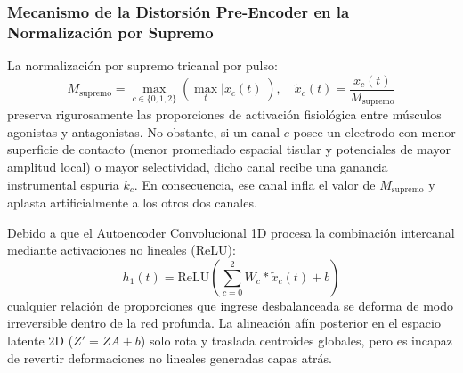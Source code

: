 \documentclass[11pt,a4paper,openany]{book}
\theoremstyle{definition}
\begin{document}
\subsubsection{Mecanismo de la Distorsión Pre-Encoder en la Normalización por Supremo}
La normalización por supremo tricanal por pulso:
\begin{equation}
M_{\text{supremo}} = \max_{c \in \{0, 1, 2\}} \left( \max_t |x_c(t)| \right), \quad \tilde{x}_c(t) = \frac{x_c(t)}{M_{\text{supremo}}}
\end{equation}
preserva rigurosamente las proporciones de activación fisiológica entre músculos agonistas y antagonistas. No obstante, si un canal $c$ posee un electrodo con menor superficie de contacto (menor promediado espacial tisular y potenciales de mayor amplitud local) o mayor selectividad, dicho canal recibe una ganancia instrumental espuria $k_c$. En consecuencia, ese canal infla el valor de $M_{\text{supremo}}$ y aplasta artificialmente a los otros dos canales.

Debido a que el Autoencoder Convolucional 1D procesa la combinación intercanal mediante activaciones no lineales ($\text{ReLU}$):
\begin{equation}
h_1(t) = \text{ReLU}\left( \sum_{c=0}^2 W_c * \tilde{x}_c(t) + b \right)
\end{equation}
cualquier relación de proporciones que ingrese desbalanceada se deforma de modo irreversible dentro de la red profunda. La alineación afín posterior en el espacio latente 2D ($Z' = Z A + b$) solo rota y traslada centroides globales, pero es incapaz de revertir deformaciones no lineales generadas capas atrás.
\end{document}
